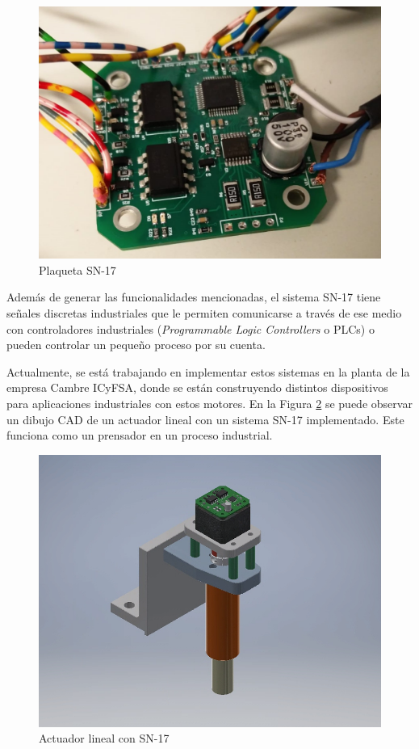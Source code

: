 \begin{figure}[htbp]
	\centering
	\includegraphics[scale=.3]{./Figures/SN17_5.jpeg}
	\caption{Plaqueta SN-17}
	\label{fig:SN17}
\end{figure}

Además de generar las funcionalidades mencionadas, el sistema SN-17 tiene señales discretas industriales que le permiten comunicarse a través de ese medio con controladores industriales (\textit{Programmable Logic Controllers} o PLCs) o pueden controlar un pequeño proceso por su cuenta.

Actualmente, se está trabajando en implementar estos sistemas en la planta de la empresa Cambre ICyFSA, donde se están construyendo distintos dispositivos para aplicaciones industriales con estos motores. En la Figura \ref{fig:aplicacionSN17} se puede observar un dibujo CAD de un actuador lineal con un sistema SN-17 implementado. Este funciona como un prensador en un proceso industrial.

\begin{figure}[htbp]
	\centering
	\includegraphics[scale=.6]{./Figures/Prensador-N17.PNG}
	\caption{Actuador lineal con SN-17}
	\label{fig:aplicacionSN17}
\end{figure}

